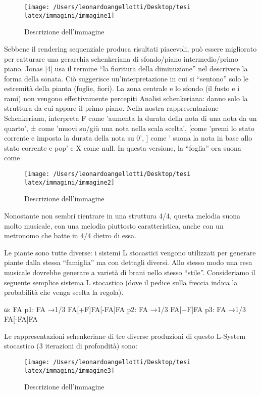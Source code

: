\documentclass[a4paper,12pt]{report}
\begin{document}
\begin{figure}[h!]
    \centering
    \texttt{[image: /Users/leonardoangellotti/Desktop/tesi latex/immagini/immagine1]} 
    \caption{Descrizione dell'immagine}
    \label{fig:immagine}
\end{figure}

Sebbene il rendering sequenziale produca risultati piacevoli, può essere migliorato per catturare una gerarchia schenkeriana di sfondo/piano intermedio/primo piano. 
Jonas [4] usa il termine “la fioritura della diminuzione” nel descrivere la forma della sonata. 
Ciò suggerisce un'interpretazione in cui si “sentono” solo le estremità della pianta (foglie, fiori). La zona centrale e lo sfondo (il fusto e i rami) non vengono effettivamente percepiti
Analisi schenkeriana: danno solo la struttura da cui appare il primo piano.
Nella nostra rappresentazione Schenkeriana, interpreta F come 'aumenta la durata della nota di una nota da un quarto', ± come 'muovi su/giù una nota nella scala scelta', [come 'premi lo stato corrente e imposta la durata della nota su 0', ] come ' suona la nota in base allo stato corrente e pop' e X come null.
In questa versione, la “foglia” ora suona come

\begin{figure}[h!]
    \centering
    \texttt{[image: /Users/leonardoangellotti/Desktop/tesi latex/immagini/immagine2]} 
    \caption{Descrizione dell'immagine}
    \label{fig:immagine}
\end{figure}

Nonostante non sembri rientrare in una struttura 4/4, questa melodia suona molto musicale, con una melodia piuttosto caratteristica, anche con un metronomo che batte in 4/4 dietro di essa.

Le piante sono tutte diverse: i sistemi L stocastici vengono utilizzati per generare piante dalla stessa
“famiglia” ma con dettagli diversi. Allo stesso modo una resa musicale dovrebbe generare a
varietà di brani nello stesso “stile”. Consideriamo il seguente semplice sistema L stocastico
(dove il pedice sulla freccia indica la probabilità che venga scelta la regola).

ω: FA 
p1: FA →1/3 FA[+F]FA[-FA]FA 
p2: FA →1/3 FA[+F]FA 
p3: FA →1/3 FA[-FA]FA

Le rappresentazioni schenkeriane di tre diverse produzioni di questo L-System stocastico (3 iterazioni di profondità) sono:

\begin{figure}[h!]
    \centering
    \texttt{[image: /Users/leonardoangellotti/Desktop/tesi latex/immagini/immagine3]} 
    \caption{Descrizione dell'immagine}
    \label{fig:immagine}
\end{figure}
\end{document}
